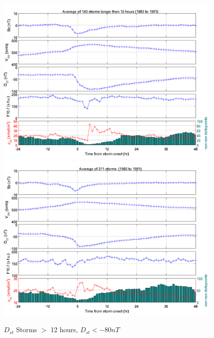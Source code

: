 \documentclass[10pt,twocolumn]{article}
\begin{document}
\begin{figure}[htp!]
\centering
\includegraphics[scale=0.7]{paperfigures/stormavs-dd12.png}
\includegraphics[scale=0.7]{paperfigures/stormavs-d80.png}
\caption{$D_{st}$ Storms $>$ 12 hours, $D_{st}<-80nT$}
\label{Dspec}
\end{figure}
\clearpage
\end{document}
